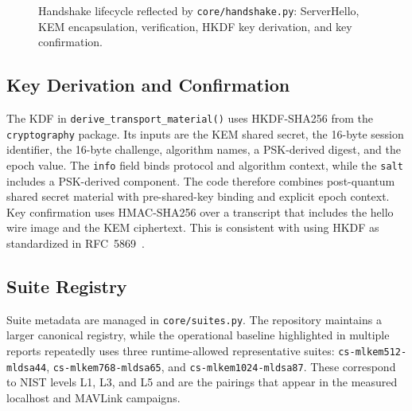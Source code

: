 \documentclass[conference]{IEEEtran}
\begin{document}
\begin{figure}[htbp]
\centering
{}
\caption{Handshake lifecycle reflected by \texttt{core/handshake.py}: ServerHello, KEM encapsulation, verification, HKDF key derivation, and key confirmation.}
\label{fig:handshake-sequence}
\end{figure}

\subsection{Key Derivation and Confirmation}
The KDF in \texttt{derive\_transport\_material()} uses HKDF-SHA256 from the \texttt{cryptography} package. Its inputs are the KEM shared secret, the 16-byte session identifier, the 16-byte challenge, algorithm names, a PSK-derived digest, and the epoch value. The \texttt{info} field binds protocol and algorithm context, while the \texttt{salt} includes a PSK-derived component. The code therefore combines post-quantum shared secret material with pre-shared-key binding and explicit epoch context. Key confirmation uses HMAC-SHA256 over a transcript that includes the hello wire image and the KEM ciphertext. This is consistent with using HKDF as standardized in RFC~5869~\cite{rfc5869}.

\subsection{Suite Registry}
Suite metadata are managed in \texttt{core/suites.py}. The repository maintains a larger canonical registry, while the operational baseline highlighted in multiple reports repeatedly uses three runtime-allowed representative suites: \texttt{cs-mlkem512-mldsa44}, \texttt{cs-mlkem768-mldsa65}, and \texttt{cs-mlkem1024-mldsa87}. These correspond to NIST levels L1, L3, and L5 and are the pairings that appear in the measured localhost and MAVLink campaigns.
\end{document}
